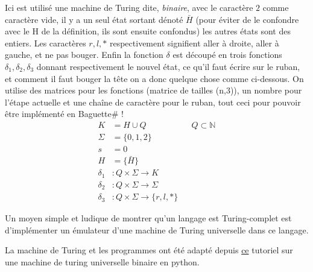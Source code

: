 \documentclass[11pt,colorlinks=true,a4paper]{article}
\newcommand{\bsf}{Baguette\# }
\begin{document}
        
        Ici est utilisé une machine de Turing dite, \textit{binaire}, avec le caractère $2$ comme caractère vide, 
        il y a un seul état sortant dénoté $\bar{H}$ (pour éviter de le confondre avec le H de la définition, ils sont ensuite confondus) 
        les autres états sont des entiers. 
        Les caractères $r,l,*$ respectivement signifient aller à droite, aller à gauche, et ne pas bouger.
        Enfin la fonction $\delta$ est découpé en trois fonctions $\delta_1,\delta_2,\delta_3$ donnant respectivement 
        le nouvel état, ce qu'il faut écrire sur le ruban, et comment il faut bouger la tête
         on a donc quelque chose comme ci-dessous. 
         On utilise des matrices pour les fonctions (matrice de tailles (n,3)), un nombre pour l'étape actuelle et une chaîne de caractère pour le ruban,
         tout ceci pour pouvoir être implémenté en \bsf!
        \begin{align*}
            K &= H \cup Q && Q \subset \mathbb{N} \\
            \Sigma &= \{0,1,2\} \\ 
            s &= 0 \\ 
            H &= \{\bar{H}\} \\ 
            \delta_1 &: Q \times \Sigma \to K \\ 
            \delta_2 &: Q \times \Sigma \to \Sigma \\ 
            \delta_3 &: Q \times \Sigma \to \{r,l,*\}
        \end{align*}

    Un moyen simple et ludique de montrer qu'un langage est Turing-complet est d'implémenter un émulateur d'une machine de Turing 
    universelle dans ce langage.\par 
    \bigskip 
    La machine de Turing et les programmes ont été adapté depuis \href{https://sandipanweb.wordpress.com/2020/08/08/simulating-a-turing-machine-with-python-and-executing-programs/}{ce} tutoriel sur une machine de turing universelle binaire 
    en python.
\end{document}
